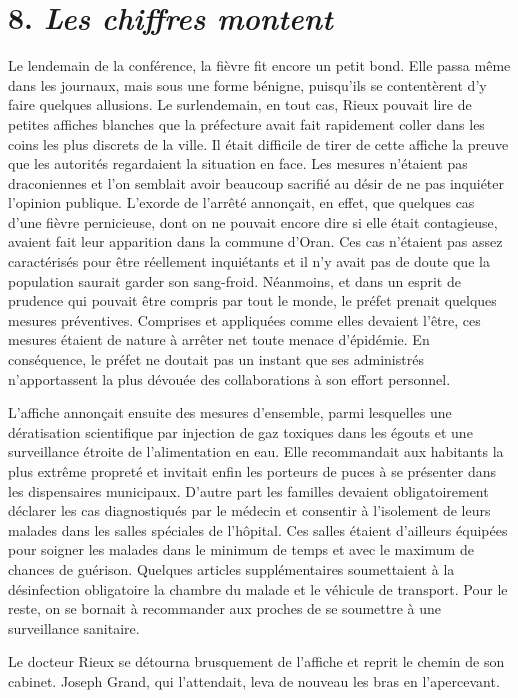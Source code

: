 \documentclass[french,twoside]{book} %
\begin{document}
\section[{8. Les chiffres montent}]{8. \emph{Les chiffres montent}}
\noindent Le lendemain de la conférence, la fièvre fit encore un petit bond. Elle passa même dans les journaux, mais sous une forme bénigne, puisqu’ils se contentèrent d’y faire quelques allusions. Le surlendemain, en tout cas, Rieux pouvait lire de petites affiches blanches que la préfecture avait fait rapidement coller dans les coins les plus discrets de la ville. Il était difficile de tirer de cette affiche la preuve que les autorités regardaient la situation en face. Les mesures n’étaient pas draconiennes et l’on semblait avoir beaucoup sacrifié au désir de ne pas inquiéter l’opinion publique. L’exorde de l’arrêté annonçait, en effet, que quelques cas d’une fièvre pernicieuse, dont on ne pouvait encore dire si elle était contagieuse, avaient fait leur apparition dans la commune d’Oran. Ces cas n’étaient pas assez caractérisés pour être réellement inquiétants et il n’y avait pas de doute que la population saurait garder son sang-froid. Néanmoins, et dans un esprit de prudence qui pouvait être compris par tout le monde, le préfet prenait quelques mesures préventives. Comprises et appliquées comme elles devaient l’être, ces mesures étaient de nature à arrêter net toute menace d’épidémie. En conséquence, le préfet ne doutait pas un instant que ses administrés n’apportassent la plus dévouée des collaborations à son effort personnel.\par
L’affiche annonçait ensuite des mesures d’ensemble, parmi lesquelles une dératisation scientifique par injection de gaz toxiques dans les égouts et une surveillance étroite de l’alimentation en eau. Elle recommandait aux habitants la plus extrême propreté et invitait enfin les porteurs de puces à se présenter dans les dispensaires municipaux. D’autre part les familles devaient obligatoirement déclarer les cas diagnostiqués par le médecin et consentir à l’isolement de leurs malades dans les salles spéciales de l’hôpital. Ces salles étaient d’ailleurs équipées pour soigner les malades dans le minimum de temps et avec le maximum de chances de guérison. Quelques articles supplémentaires soumettaient à la désinfection obligatoire la chambre du malade et le véhicule de transport. Pour le reste, on se bornait à recommander aux proches de se soumettre à une surveillance sanitaire.\par
Le docteur Rieux se détourna brusquement de l’affiche et reprit le chemin de son cabinet. Joseph Grand, qui l’attendait, leva de nouveau les bras en l’apercevant.\par
\end{document}
